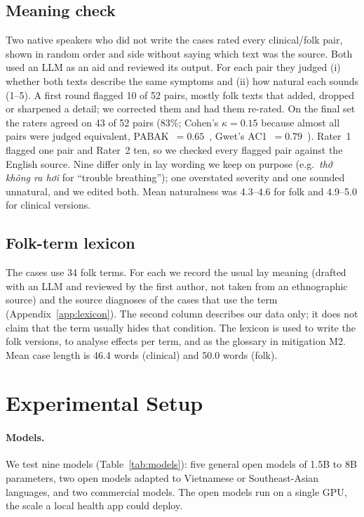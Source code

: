 \documentclass[runningheads]{llncs}
\newcommand{\vi}[1]{\textit{#1}}   %
\begin{document}
\subsection{Meaning check}\label{sec:meaning}
Two native speakers who did not write the cases rated every clinical/folk pair, shown in random order and side without saying which text was the source. Both used an LLM as an aid and reviewed its output. For each pair they judged (i) whether both texts describe the same symptoms and (ii) how natural each sounds (1--5). A first round flagged 10 of 52 pairs, mostly folk texts that added, dropped or sharpened a detail; we corrected them and had them re-rated. On the final set the raters agreed on 43 of 52 pairs (83\%; Cohen's $\kappa=0.15$ because almost all pairs were judged equivalent, PABAK~$=0.65$~\cite{byrt1993bias}, Gwet's AC1~$=0.79$~\cite{gwet2008ac1}). Rater~1 flagged one pair and Rater~2 ten, so we checked every flagged pair against the English source. Nine differ only in lay wording we keep on purpose (e.g.\ \vi{thở không ra hơi} for ``trouble breathing''); one overstated severity and one sounded unnatural, and we edited both. Mean naturalness was 4.3--4.6 for folk and 4.9--5.0 for clinical versions.

\subsection{Folk-term lexicon}
The cases use 34 folk terms. For each we record the usual lay meaning (drafted with an LLM and reviewed by the first author, not taken from an ethnographic source) and the source diagnoses of the cases that use the term (Appendix~\ref{app:lexicon}). The second column describes our data only; it does not claim that the term usually hides that condition. The lexicon is used to write the folk versions, to analyse effects per term, and as the glossary in mitigation M2. Mean case length is 46.4 words (clinical) and 50.0 words (folk).

\section{Experimental Setup}

\paragraph{Models.} We test nine models (Table~\ref{tab:models}): five general open models of 1.5B to 8B parameters, two open models adapted to Vietnamese or Southeast-Asian languages, and two commercial models. The open models run on a single GPU, the scale a local health app could deploy.
\end{document}

